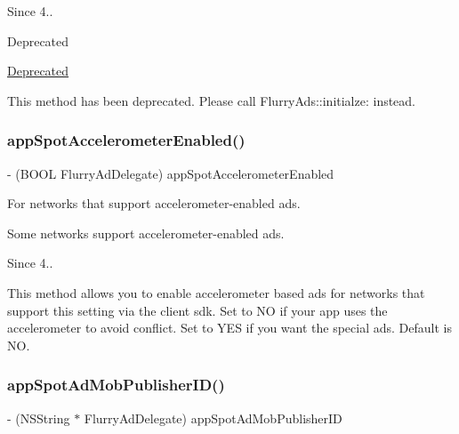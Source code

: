 \begin{DoxySince}{Since}
4.. 
\end{DoxySince}
\begin{DoxyRefDesc}{Deprecated}
\item[\hyperlink{deprecated__deprecated000227}{Deprecated}]\end{DoxyRefDesc}


This method has been deprecated. Please call Flurry\+Ads\+::initialze\+: instead. \mbox{\label{protocolFlurryAdDelegate_01-p_a8f9730aef4765d97bfbb612cdcfa74dc}} 
\subsubsection{\texorpdfstring{app\+Spot\+Accelerometer\+Enabled()}{appSpotAccelerometerEnabled()}}
{\footnotesize\ttfamily -\/ (B\+O\+OL Flurry\+Ad\+Delegate) app\+Spot\+Accelerometer\+Enabled \begin{DoxyParamCaption}{ }\end{DoxyParamCaption}}



For networks that support accelerometer-\/enabled ads. 

Some networks support accelerometer-\/enabled ads.

\begin{DoxySince}{Since}
4..
\end{DoxySince}
This method allows you to enable accelerometer based ads for networks that support this setting via the client sdk. Set to NO if your app uses the accelerometer to avoid conflict. Set to Y\+ES if you want the special ads. Default is NO. \mbox{\label{protocolFlurryAdDelegate_01-p_a7d107749c75f41d2590dbf3e8a1e64bf}} 
\subsubsection{\texorpdfstring{app\+Spot\+Ad\+Mob\+Publisher\+I\+D()}{appSpotAdMobPublisherID()}}
{\footnotesize\ttfamily -\/ (N\+S\+String $\ast$ Flurry\+Ad\+Delegate) app\+Spot\+Ad\+Mob\+Publisher\+ID \begin{DoxyParamCaption}{ }\end{DoxyParamCaption}}



